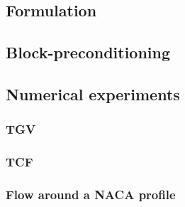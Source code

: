\documentclass[compress,11 pt,t]{beamer}
\begin{document}
\subsection{Formulation}

\subsection{Block-preconditioning}

\subsection{Numerical experiments}

\subsubsection{TGV}

\subsubsection{TCF}

\subsubsection{Flow around a NACA profile}

\end{document}
